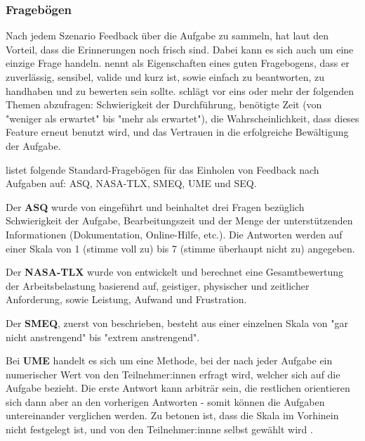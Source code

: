 \subsubsection{Fragebögen}

Nach jedem Szenario Feedback über die Aufgabe zu sammeln, hat laut \textcite{barnumUsabilityTesting2021} den Vorteil, dass die Erinnerungen noch frisch sind. Dabei kann es sich auch um eine einzige Frage handeln. \textcite{sauroIfYou2010} nennt als Eigenschaften eines guten Fragebogens, dass er zuverlässig, sensibel, valide und kurz ist, sowie einfach zu beantworten, zu handhaben und zu bewerten sein sollte. \textcite{barnumUsabilityTesting2021} schlägt vor eins oder mehr der folgenden Themen abzufragen: Schwierigkeit der Durchführung, benötigte Zeit (von "weniger als erwartet" bis "mehr als erwartet"), die Wahrscheinlichkeit, dass dieses Feature erneut benutzt wird, und das Vertrauen in die erfolgreiche Bewältigung der Aufgabe.

\textcite{sauroIfYou2010} listet folgende Standard-Fragebögen für das Einholen von Feedback nach Aufgaben auf: \ac{ASQ}, \ac{NASA-TLX}, \ac{SMEQ}, \ac{UME} und \ac{SEQ}.

\vspace{\baselineskip}

Der \textbf{\ac{ASQ}} wurde von \textcite{lewisPsychometricEvaluation1991} eingeführt und beinhaltet drei Fragen bezüglich Schwierigkeit der Aufgabe, Bearbeitungszeit und der Menge der unterstützenden Informationen (Dokumentation, Online-Hilfe, etc.). Die Antworten werden auf einer Skala von 1 (stimme voll zu) bis 7 (stimme überhaupt nicht zu) angegeben.

\vspace{\baselineskip}

Der \textbf{\ac{NASA-TLX}} wurde von \textcite{hartDevelopmentNASATLX1988} entwickelt und berechnet eine Gesamtbewertung der Arbeitsbelastung basierend auf, geistiger, physischer und zeitlicher Anforderung, sowie Leistung, Aufwand und Frustration. \parencite{nasaNASATLX}

\vspace{\baselineskip}

Der \textbf{\ac{SMEQ}}, zuerst von \textcite{zijlstraConstructionScale1985} beschrieben, besteht aus einer einzelnen Skala von "gar nicht anstrengend" bis "extrem anstrengend". 

\vspace{\baselineskip}

Bei \textbf{\ac{UME}} handelt es sich um eine Methode, bei der nach jeder Aufgabe ein numerischer Wert von den Teilnehmer:innen erfragt wird, welcher sich auf die Aufgabe bezieht. Die erste Antwort kann arbiträr sein, die restlichen orientieren sich dann aber an den vorherigen Antworten - somit können die Aufgaben untereinander verglichen werden. Zu betonen ist, dass die Skala im Vorhinein nicht festgelegt ist, und von den Teilnehmer:innne selbst gewählt wird \parencite{mcgeeUsabilityMagnitude2003}.

